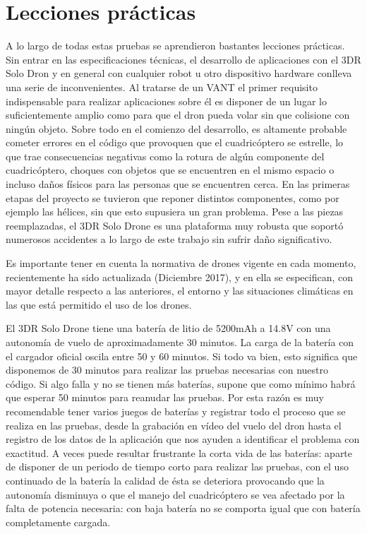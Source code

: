 \section{Lecciones prácticas}
A lo largo de todas estas pruebas se aprendieron bastantes lecciones prácticas. Sin entrar en las especificaciones técnicas, el desarrollo de aplicaciones con el 3DR Solo Dron y en general con cualquier robot u otro dispositivo hardware conlleva una serie de inconvenientes. Al tratarse de un VANT el primer requisito indispensable para realizar aplicaciones sobre él es disponer de un lugar lo suficientemente amplio como para que el dron pueda volar sin que colisione con ningún objeto. Sobre todo en el comienzo del desarrollo, es altamente probable cometer errores en el código que provoquen que el cuadricóptero se estrelle, lo que trae consecuencias negativas como la rotura de algún componente del cuadricóptero, choques con objetos que se encuentren en el mismo espacio o incluso daños físicos para las personas que se encuentren cerca. En las primeras etapas del proyecto se tuvieron que reponer distintos componentes, como por ejemplo las hélices, sin que esto supusiera un gran problema. Pese a las piezas reemplazadas, el 3DR Solo Drone es una plataforma muy robusta que soportó numerosos accidentes a lo largo de este trabajo sin sufrir daño significativo.

Es importante tener en cuenta la normativa de drones vigente en cada momento, recientemente ha sido actualizada (Diciembre 2017), y en ella se especifican, con mayor detalle respecto a las anteriores, el entorno y las situaciones climáticas en las que está permitido el uso de los drones. 

El 3DR Solo Drone tiene una batería de litio de 5200mAh a 14.8V con una autonomía de vuelo de aproximadamente 30 minutos. La carga de la batería con el cargador oficial oscila entre 50 y 60 minutos. Si todo va bien, esto significa que disponemos de 30 minutos para realizar las pruebas necesarias con nuestro código. Si algo falla y no se tienen más baterías, supone que como mínimo habrá que esperar 50 minutos para reanudar las pruebas. Por esta razón es muy recomendable tener varios juegos de baterías y registrar todo el proceso que se realiza en las pruebas, desde la grabación en vídeo del vuelo del dron hasta el registro de los datos de la aplicación que nos ayuden a identificar el problema con exactitud. A veces puede resultar frustrante la corta vida de las baterías: aparte de disponer de un periodo de tiempo corto para realizar las pruebas, con el uso continuado de la batería la calidad de ésta se deteriora provocando que la autonomía disminuya o que el manejo del cuadricóptero se vea afectado por la falta de potencia necesaria: con baja batería no se comporta igual que con batería completamente cargada.

